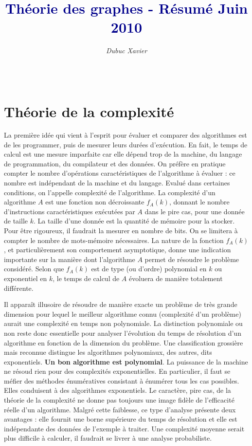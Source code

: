 \documentclass{article}
\title{\textbf{\textcolor{darkblue}{Théorie des graphes - Résumé Juin 2010}}}
\author{\textit{Dubuc Xavier}}
\begin{document}
\maketitle

\hbox{\raisebox{0.4em}{\vrule depth 0.4pt height 0.4pt width 10cm}}

\tableofcontents

$ $ \\
\hbox{\raisebox{0.4em}{\vrule depth 0.4pt height 0.4pt width 10cm}}

\newpage

\section{Théorie de la complexité}

La première idée qui vient à l’esprit pour évaluer et comparer des algorithmes est de les programmer, puis de mesurer leurs durées d’exécution. En fait, le temps de calcul est une 
mesure imparfaite car elle dépend trop de la machine, du langage de programmation, du compilateur et des données. On préfère en pratique compter le nombre d’opérations
caractéristiques de l’algorithme à évaluer : ce nombre est indépendant de la machine et du langage. Evalué dans certaines conditions, on l’appelle complexité de l’algorithme.
La complexité d’un algorithme $A$ est une fonction non décroissante $f_A(k)$, donnant le nombre d’instructions caractéristiques exécutées par $A$ dans le pire cas, pour une 
donnée de taille $k$. La taille d’une donnée est la quantité de mémoire pour la stocker. Pour être rigoureux, il faudrait la mesurer en nombre de bits. On se limitera à compter le 
nombre de mots-mémoire nécessaires. La nature de la fonction $f_A(k)$, et particulièrement son comportement asymptotique, donne une indication importante sur la manière 
dont l’algorithme $A$ permet de résoudre le problème considéré. Selon que $f_A(k)$ est de type (ou d’ordre) polynomial en $k$ ou exponentiel en $k$, le temps de calcul de $A$ 
évoluera de manière totalement différente.

Il apparaît illusoire de résoudre de manière exacte un problème de très grande dimension pour lequel le meilleur algorithme connu (complexité d’un problème) aurait une complexité
en temps non polynomiale. La distinction polynomiale ou non reste donc essentielle pour analyser l’évolution du temps de résolution d’un algorithme en fonction de la dimension du 
problème. Une classification grossière mais reconnue distingue les algorithmes polynomiaux, des autres, dits exponentiels. \textbf{Un bon algorithme est polynomial}. La puissance 
de la machine ne résoud rien pour des complexités exponentielles. En particulier, il faut se méfier des méthodes énumératives consistant à énumérer tous les cas possibles. Elles
conduisent à des algorithmes exponentiels. Le caractère, pire cas, de la théorie de la complexité ne donne pas toujours une image fidèle de l’efficacité réelle d’un algorithme. 
Malgré cette faiblesse, ce type d’analyse présente deux avantages : elle fournit une borne supérieure du temps de résolution et elle est indépendante des données de l’exemple à 
traiter. Une complexité moyenne serait plus difficile à calculer, il faudrait se livrer à une analyse probabiliste.
\end{document}
